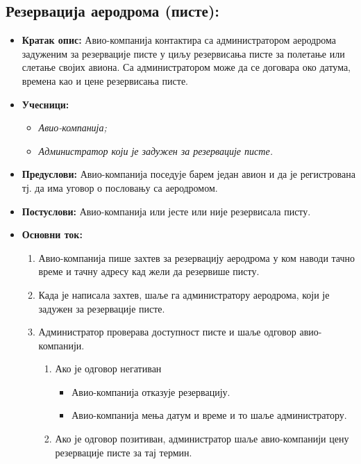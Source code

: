 \documentclass{article}
\begin{document}
\subsection{Резервација аеродрома (писте):}

\begin{itemize}
    \item \textbf{Кратак опис:} Авио-компанија контактира са администратором аеродрома задуженим за резервације писте у циљу резервисања писте за полетање или слетање својих авиона. Са администратором може да се договара око датума, времена као и цене резервисања писте.
    \item \textbf{Учесници:}
        \begin{itemize}
            \item \textit{Авио-компанија;}
            \item \textit{Администратор који је задужен за резервације писте.}
        \end{itemize}
    \item \textbf{Предуслови:} Авио-компанија поседује барем један авион и да је регистрована тј. да има уговор о пословању са аеродромом.
    \item \textbf{Постуслови:} Авио-компанија или јесте или није резервисала писту.
    \item \textbf{Основни ток:}
        \begin{enumerate}
            \item Авио-компанија пише захтев за резервацију аеродрома у ком наводи тачно време и тачну адресу кад жели да резервише писту.
            \item Када је написала захтев, шаље га администратору аеродрома, који је задужен за резервације писте.
            \item Администратор проверава доступност писте и шаље одговор авио-компанији.
                \begin{enumerate}
                    \item Ако је одговор негативан
                        \begin{itemize}
                            \item Авио-компанија отказује резервацију.
                            \item Авио-компанија мења датум и време и то шаље администратору.
                        \end{itemize}
                    \item Ако је одговор позитиван, администратор шаље авио-компанији цену резервације писте за тај термин.

\end{enumerate}
\end{enumerate}
\end{itemize}
\end{document}
